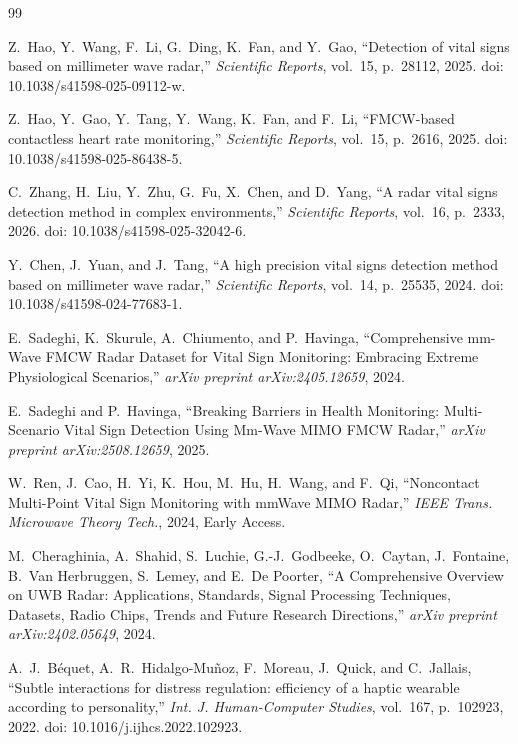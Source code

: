 
\begin{thebibliography}{99}

Z.~Hao, Y.~Wang, F.~Li, G.~Ding, K.~Fan, and Y.~Gao, ``Detection of vital signs based on millimeter wave radar,'' \textit{Scientific Reports}, vol.~15, p.~28112, 2025. doi: 10.1038/s41598-025-09112-w.

Z.~Hao, Y.~Gao, Y.~Tang, Y.~Wang, K.~Fan, and F.~Li, ``FMCW-based contactless heart rate monitoring,'' \textit{Scientific Reports}, vol.~15, p.~2616, 2025. doi: 10.1038/s41598-025-86438-5.

C.~Zhang, H.~Liu, Y.~Zhu, G.~Fu, X.~Chen, and D.~Yang, ``A radar vital signs detection method in complex environments,'' \textit{Scientific Reports}, vol.~16, p.~2333, 2026. doi: 10.1038/s41598-025-32042-6.

Y.~Chen, J.~Yuan, and J.~Tang, ``A high precision vital signs detection method based on millimeter wave radar,'' \textit{Scientific Reports}, vol.~14, p.~25535, 2024. doi: 10.1038/s41598-024-77683-1.

E.~Sadeghi, K.~Skurule, A.~Chiumento, and P.~Havinga, ``Comprehensive mm-Wave FMCW Radar Dataset for Vital Sign Monitoring: Embracing Extreme Physiological Scenarios,'' \textit{arXiv preprint arXiv:2405.12659}, 2024.

E.~Sadeghi and P.~Havinga, ``Breaking Barriers in Health Monitoring: Multi-Scenario Vital Sign Detection Using Mm-Wave MIMO FMCW Radar,'' \textit{arXiv preprint arXiv:2508.12659}, 2025.

W.~Ren, J.~Cao, H.~Yi, K.~Hou, M.~Hu, H.~Wang, and F.~Qi, ``Noncontact Multi-Point Vital Sign Monitoring with mmWave MIMO Radar,'' \textit{IEEE Trans. Microwave Theory Tech.}, 2024, Early Access.

M.~Cheraghinia, A.~Shahid, S.~Luchie, G.-J.~Godbeeke, O.~Caytan, J.~Fontaine, B.~Van Herbruggen, S.~Lemey, and E.~De Poorter, ``A Comprehensive Overview on UWB Radar: Applications, Standards, Signal Processing Techniques, Datasets, Radio Chips, Trends and Future Research Directions,'' \textit{arXiv preprint arXiv:2402.05649}, 2024.

A.~J.~B\'{e}quet, A.~R.~Hidalgo-Mu\~{n}oz, F.~Moreau, J.~Quick, and C.~Jallais, ``Subtle interactions for distress regulation: efficiency of a haptic wearable according to personality,'' \textit{Int. J. Human-Computer Studies}, vol.~167, p.~102923, 2022. doi: 10.1016/j.ijhcs.2022.102923.


\end{thebibliography}
